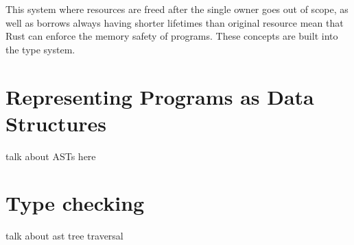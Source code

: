 This system where resources are freed after the single owner goes out of scope,
as well as borrows always having shorter lifetimes than original resource
mean that Rust can enforce the memory safety of programs. These concepts are
built into the type system.

\section{Representing Programs as Data Structures}
talk about ASTs here

\section{Type checking}
talk about ast tree traversal
